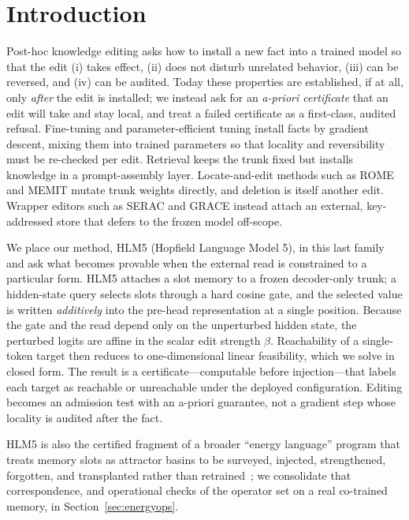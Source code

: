 \documentclass[10pt,twocolumn]{article}
\theoremstyle{remark}
\begin{document}
\section{Introduction}

Post-hoc knowledge editing asks how to install a new fact into a trained model so
that the edit (i) takes effect, (ii) does not disturb unrelated behavior, (iii)
can be reversed, and (iv) can be audited. Today these properties are
established, if at all, only \emph{after} the edit is installed; we
instead ask for an \emph{a-priori certificate} that an edit will take and stay local,
and treat a failed certificate as a first-class, audited refusal. Fine-tuning and parameter-efficient
tuning install facts by gradient descent, mixing them into trained parameters so
that locality and reversibility must be re-checked per
edit. Retrieval keeps the trunk fixed but installs knowledge in a prompt-assembly
layer. Locate-and-edit methods such as ROME and MEMIT \citep{meng2022rome,
meng2022memit} mutate trunk weights directly, and deletion is itself another
edit. Wrapper editors such as SERAC and GRACE \citep{mitchell2022serac,
hartvigsen2023grace} instead attach an external, key-addressed store that defers
to the frozen model off-scope.

We place our method, HLM5 (Hopfield Language Model 5), in this last family and ask what becomes provable when
the external read is constrained to a particular form. HLM5 attaches a slot memory
to a frozen decoder-only trunk; a hidden-state query selects slots through a hard
cosine gate, and the selected value is written \emph{additively} into the
pre-head representation at a single position. Because the gate and the read depend
only on the unperturbed hidden state, the perturbed logits are affine in the
scalar edit strength $\beta$. Reachability of a single-token target then reduces
to one-dimensional linear feasibility, which we solve in closed form. The result
is a certificate---computable before injection---that labels each target as
reachable or unreachable under the deployed configuration. Editing becomes an
admission test with an a-priori guarantee, not a gradient step whose locality is
audited after the fact.

HLM5 is also the certified fragment of a broader ``energy language'' program that
treats memory slots as attractor basins to be surveyed, injected, strengthened,
forgotten, and transplanted rather than retrained~\citep{qriton2026energylang,
qriton2026hlm}; we consolidate that correspondence, and operational checks of the
operator set on a real co-trained memory, in Section~\ref{sec:energyops}.
\end{document}
